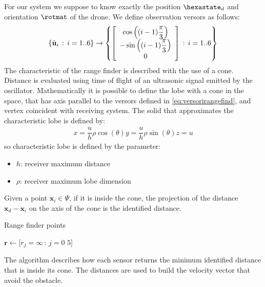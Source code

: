 For our system we suppose to know exactly the position $\hexastate_d$ and orientation $\rotmat$ of the drone. We define observation versors as follows:
\begin{equation}
\label{eq:versorirangefind}
\left\{ \hat{\mathbf{u}}_i \,:\, i=1..6 \right\} \rightarrow \left\{ \left[\begin{array}{c}\cos\left( (i-1)\dfrac{\pi}{3} \right) \\ -\sin\left( (i-1)\dfrac{\pi}{3} \right) \\0\end{array}\right] \,:\, i=1..6 \right\}
\end{equation}
The characteristic of the range finder is described with the use of a cone. Distance is evaluated using time of flight of an ultrasonic signal emitted by the oscillator. Mathematically it is possible to define the lobe with a cone in the space, that has axis parallel to the versors defined in \ref{eq:versorirangefind}, and vertex coincident with receiving system. The solid that approximates the characteristic lobe is defined by:
\begin{equation}
\begin{array}{rcl}
x = \dfrac{u}{h} \rho \cos(\theta)
y = \dfrac{u}{h} \rho \sin(\theta)
z = u
\end{array}
\end{equation}
so characteristic lobe is defined by the parameter:
\begin{itemize}
\item $h$: receiver maximum distance
\item $\rho$: receiver maximum lobe dimension
\end{itemize}
Given a point ${\mathbf{x}_i \in \Psi}$, if it is inside the cone, the projection of the distance ${\mathbf{x}_d-\mathbf{x}_i}$ on the axis of the cone is the identified distance.
\begin{algorithm}[H]
\caption{Range finder points}
$\mathbf{r} \leftarrow [r_j = \infty\,:\,j=0$ \KwTo $5]$\;
\end{algorithm}
The algorithm describes how each sensor returns the minimum identified distance that is inside its cone. The distances are used to build the velocity vector that avoid the obstacle.